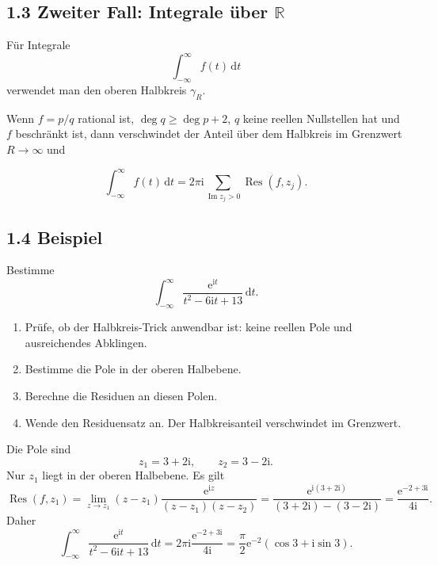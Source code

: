 \documentclass[11pt,a4paper]{article}
\newcommand{\R}{\mathbb R}
\newcommand{\ii}{\mathrm i}
\newcommand{\ee}{\mathrm e}
\newcommand{\dd}{\,\mathrm d}
\newcommand{\Res}{\operatorname{Res}}
\newcommand{\Imm}{\operatorname{Im}}
\begin{document}
\subsection{1.3 Zweiter Fall: Integrale über $\R$}
Für Integrale
\[
\int_{-\infty}^{\infty}f(t)\dd t
\]
verwendet man den oberen Halbkreis $\gamma_R$.

\begin{center}
\end{center}

Wenn $f=p/q$ rational ist, $\deg q\ge \deg p+2$, $q$ keine reellen Nullstellen hat und $f$ beschränkt ist, dann verschwindet der Anteil über dem Halbkreis im Grenzwert $R\to\infty$ und
\begin{importantbox}
\[
\int_{-\infty}^{\infty}f(t)\dd t=2\pi\ii\sum_{\Imm z_j>0}\Res(f,z_j).
\]
\end{importantbox}

\subsection{1.4 Beispiel}
\begin{beispielbox}
Bestimme
\[
\int_{-\infty}^{\infty}\frac{\ee^{\ii t}}{t^2-6\ii t+13}\dd t.
\]
\end{beispielbox}
\begin{kochrezeptbox}
\begin{enumerate}[label=\Roman*.]
\item Prüfe, ob der Halbkreis-Trick anwendbar ist: keine reellen Pole und ausreichendes Abklingen.
\item Bestimme die Pole in der oberen Halbebene.
\item Berechne die Residuen an diesen Polen.
\item Wende den Residuensatz an. Der Halbkreisanteil verschwindet im Grenzwert.
\end{enumerate}
\end{kochrezeptbox}
Die Pole sind
\[
z_1=3+2\ii,
\qquad z_2=3-2\ii.
\]
Nur $z_1$ liegt in der oberen Halbebene. Es gilt
\[
\Res(f,z_1)=\lim_{z\to z_1}(z-z_1)\frac{\ee^{\ii z}}{(z-z_1)(z-z_2)}
=\frac{\ee^{\ii(3+2\ii)}}{(3+2\ii)-(3-2\ii)}
=\frac{\ee^{-2+3\ii}}{4\ii}.
\]
Daher
\[
\int_{-\infty}^{\infty}\frac{\ee^{\ii t}}{t^2-6\ii t+13}\dd t
=2\pi\ii\frac{\ee^{-2+3\ii}}{4\ii}
=\frac{\pi}{2}\ee^{-2}(\cos3+\ii\sin3).
\]
\end{document}
